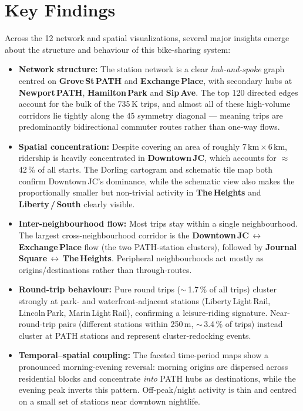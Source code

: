\documentclass[11pt, a4paper]{article}
\begin{document}
\section{Key Findings}

Across the 12 network and spatial visualizations, several major insights emerge about the structure and behaviour of this bike-sharing system:

\begin{itemize}
\item \textbf{Network structure:} The station network is a clear \emph{hub-and-spoke} graph centred on \textbf{Grove\,St\,PATH} and \textbf{Exchange\,Place}, with secondary hubs at \textbf{Newport\,PATH}, \textbf{Hamilton\,Park} and \textbf{Sip\,Ave}. The top 120 directed edges account for the bulk of the 735\,K trips, and almost all of these high-volume corridors lie tightly along the 45\textdegree{} symmetry diagonal --- meaning trips are predominantly bidirectional commuter routes rather than one-way flows.

\item \textbf{Spatial concentration:} Despite covering an area of roughly 7\,km\,$\times$\,6\,km, ridership is heavily concentrated in \textbf{Downtown\,JC}, which accounts for $\approx$\,42\,\% of all starts. The Dorling cartogram and schematic tile map both confirm Downtown\,JC's dominance, while the schematic view also makes the proportionally smaller but non-trivial activity in \textbf{The\,Heights} and \textbf{Liberty\,/\,South} clearly visible.

\item \textbf{Inter-neighbourhood flow:} Most trips stay within a single neighbourhood. The largest cross-neighbourhood corridor is the \textbf{Downtown\,JC\,$\leftrightarrow$\,Exchange\,Place} flow (the two PATH-station clusters), followed by \textbf{Journal\,Square\,$\leftrightarrow$\,The\,Heights}. Peripheral neighbourhoods act mostly as origins/destinations rather than through-routes.

\item \textbf{Round-trip behaviour:} Pure round trips ($\sim$\,1.7\,\% of all trips) cluster strongly at park- and waterfront-adjacent stations (Liberty\,Light\,Rail, Lincoln\,Park, Marin\,Light\,Rail), confirming a leisure-riding signature. Near-round-trip pairs (different stations within 250\,m, $\sim$\,3.4\,\% of trips) instead cluster at PATH stations and represent cluster-redocking events.

\item \textbf{Temporal--spatial coupling:} The faceted time-period maps show a pronounced morning-evening reversal: morning origins are dispersed across residential blocks and concentrate \emph{into} PATH hubs as destinations, while the evening peak inverts this pattern. Off-peak/night activity is thin and centred on a small set of stations near downtown nightlife.


\end{itemize}
\end{document}
